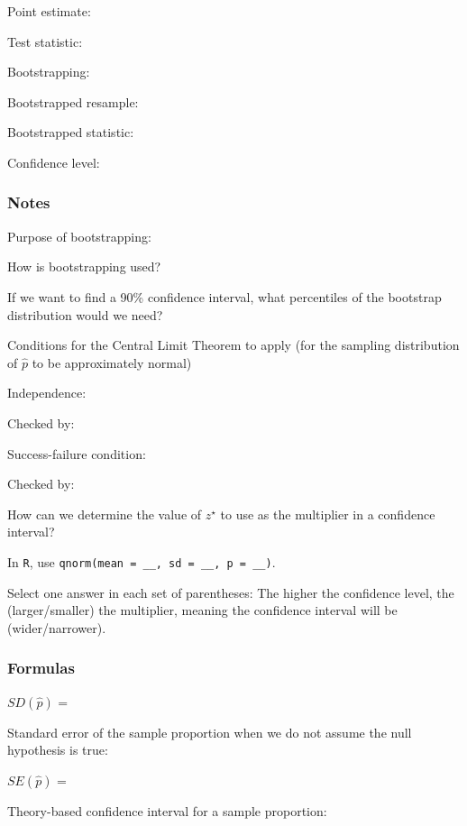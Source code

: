 \documentclass[
]{report}
\newcommand{\rgs}{\vspace{12pt}} %
\newcommand{\rgi}{\hspace{24pt}}  %
\begin{document}
Point estimate:
\rgs

Test statistic:
\rgs

Bootstrapping:
\rgs

Bootstrapped resample:
\rgs

Bootstrapped statistic:
\rgs

Confidence level:
\rgs

\hypertarget{notes-18}{%
\subsubsection*{Notes}\label{notes-18}}

Purpose of bootstrapping:
\rgs

How is bootstrapping used?\\
\rgs

If we want to find a 90\% confidence interval, what percentiles of the bootstrap distribution would we need?\\
\rgs

Conditions for the Central Limit Theorem to apply (for the sampling distribution of \(\hat{p}\) to be approximately normal)

\rgi Independence:
\rgs

\rgi \rgi Checked by:
\rgs

\rgi Success-failure condition:
\rgs

\rgi \rgi Checked by:
\rgs

How can we determine the value of \(z^⋆\) to use as the multiplier in a confidence interval?
\rgs

\rgi In \texttt{R}, use \texttt{qnorm(mean\ =\ \_\_,\ sd\ =\ \_\_,\ p\ =\ \_\_)}.

Select one answer in each set of parentheses: The higher the confidence level, the (larger/smaller) the multiplier, meaning the confidence interval will be (wider/narrower).

\hypertarget{formulas-4}{%
\subsubsection*{Formulas}\label{formulas-4}}

\(SD(\hat{p})\) =
\rgs

Standard error of the sample proportion when we do not assume the null hypothesis is true:

\(SE(\hat{p})\) =
\rgs

Theory-based confidence interval for a sample proportion:
\rgs
\end{document}
